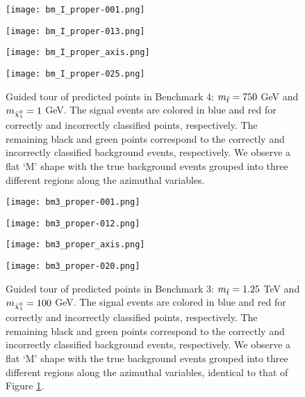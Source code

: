 \begin{figure}[htbp]
\centering
  \begin{minipage}[htbp]{0.4\textwidth}
    \centering
    \texttt{[image: bm\_I\_proper-001.png]}
  \end{minipage}
  \begin{minipage}[htbp]{0.4\textwidth}
    \centering
    \texttt{[image: bm\_I\_proper-013.png]}
  \end{minipage}
  \begin{minipage}[htbp]{0.4\textwidth}
    \centering
    \texttt{[image: bm\_I\_proper\_axis.png]}
  \end{minipage}
  \begin{minipage}[htbp]{0.4\textwidth}
    \centering
    \texttt{[image: bm\_I\_proper-025.png]}
  \end{minipage}
  \caption{Guided tour of predicted points in  Benchmark 4: $m_{\Tilde{t}} = 750$ GeV and $m_{\Tilde{\chi}_1^0} = 1$ GeV. The signal events are colored in blue and red for correctly and incorrectly classified points, respectively. The remaining black and green points correspond to the correctly and incorrectly classified background events, respectively. We observe a flat `M' shape with the true background events grouped into three different regions along the azimuthal variables.}
  \label{fig:bmIn_tour}
\end{figure}

\begin{figure}[htbp]
\centering
  \begin{minipage}[htbp]{0.4\textwidth}
    \centering
    \texttt{[image: bm3\_proper-001.png]}
  \end{minipage}
  \begin{minipage}[htbp]{0.4\textwidth}
    \centering
    \texttt{[image: bm3\_proper-012.png]}
  \end{minipage}
  \begin{minipage}[htbp]{0.4\textwidth}
    \centering
    \texttt{[image: bm3\_proper\_axis.png]}
  \end{minipage}
  \begin{minipage}[htbp]{0.4\textwidth}
    \centering
    \texttt{[image: bm3\_proper-020.png]}
  \end{minipage}
  \caption{Guided tour of predicted points in Benchmark 3: $m_{\Tilde{t}} = 1.25$ TeV and $m_{\Tilde{\chi}_1^0} = 100$ GeV. The signal events are colored in blue and red for correctly and incorrectly classified points, respectively. The remaining black and green points correspond to the correctly and incorrectly classified background events, respectively. We observe a flat `M' shape with the true background events grouped into three different regions along the azimuthal variables, identical to that of Figure \ref{fig:bmIn_tour}.}
  \label{fig:bm3_tour}
\end{figure}

